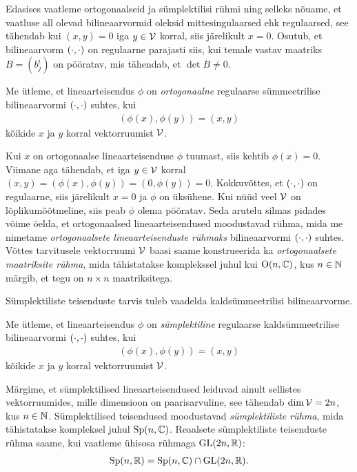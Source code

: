 Edasises vaatleme ortogonaalseid ja sümplektilisi rühmi ning selleks
nõuame, et vaatluse all olevad bilineaarvormid oleksid mittesingulaarsed
ehk regulaarsed, see tähendab kui $(x, y) = 0$ iga $y \in \mathcal{V}$ korral, siis
järelikult $x = 0$. Osutub, et bilineaarvorm $\left( \cdot, \cdot \right)$ on regulaarne parajasti
siis, kui temale vastav maatriks $B = (b^i_j)$ on pööratav, mis tähendab,
et $\det B \neq 0$.

\begin{dfn}
    Me ütleme, et lineaarteisendus $\phi$ on \emph{ortogonaalne}
    regulaarse sümmeetrilise bilineaarvormi $\left( \cdot, \cdot \right)$ suhtes, kui
    \begin{align*}
        (\phi(x), \phi(y)) = (x, y)
    \end{align*}
    kõikide $x$ ja $y$ korral vektorruumist $\mathcal{V}$.
\end{dfn}

Kui $x$ on ortogonaalse lineaarteisenduse $\phi$ tuumast, siis
kehtib $\phi(x) = 0$. Viimane aga tähendab, et iga $y \in \mathcal{V}$ korral
$(x, y) = (\phi(x), \phi(y)) = (0, \phi(y)) = 0$. Kokkuvõttes,
et $\left( \cdot, \cdot \right)$ on regulaarne, siis järelikult $x = 0$ ja $\phi$ on üksühene.
Kui nüüd veel $\mathcal{V}$ on lõplikumõõtmeline, siis peab $\phi$ olema pööratav.
Seda arutelu silmas pidades võime öelda, et ortogonaalsed lineaarteisendused
moodustavad rühma, mida me nimetame \emph{ortogonaalsete
lineaarteisenduste rühmaks} bilineaarvormi $\left( \cdot, \cdot \right)$ suhtes.
Võttes tarvitusele vektorruumi $\mathcal{V}$ baasi saame konstrueerida ka
\emph{ortogonaalsete maatriksite rühma}, mida tähistatakse komplekssel
juhul kui $\operatorname{O}(n, \mathbb{C})$, kus $n \in \mathbb{N}$ märgib, et tegu on $n \times n$
maatriksitega.

Sümplektiliste teisenduste tarvis tuleb vaadelda kaldsümmeetrilisi
bilineaarvorme.

\begin{dfn}
    Me ütleme, et lineaarteisendus $\phi$ on \emph{sümplektiline}
    regulaarse kaldsümmeetrilise bilineaarvormi $\left( \cdot, \cdot \right)$ suhtes, kui
    \begin{align*}
        (\phi(x), \phi(y)) = (x, y)
    \end{align*}
    kõikide $x$ ja $y$ korral vektorruumist $\mathcal{V}$.
\end{dfn}

Märgime, et sümplektilised lineaarteisendused leiduvad ainult sellistes
vektorruumides, mille dimensioon on paarisarvuline, see tähendab
$\dim \mathcal{V} = 2n$, kus $n \in \mathbb{N}$. Sümplektilised teisendused moodustavad
\emph{sümplektiliste rühma}, mida tähistatakse kompleksel juhul
$\operatorname{Sp}(n, \mathbb{C})$. Reaalsete sümplektiliste
teisenduste rühma saame, kui vaatleme ühisosa rühmaga $\operatorname{GL}(2n, \mathbb{R})$:
\begin{align*}
    \operatorname{Sp}(n, \mathbb{R}) = \operatorname{Sp}(n, \mathbb{C}) \cap \operatorname{GL}(2n, \mathbb{R}).
\end{align*}

